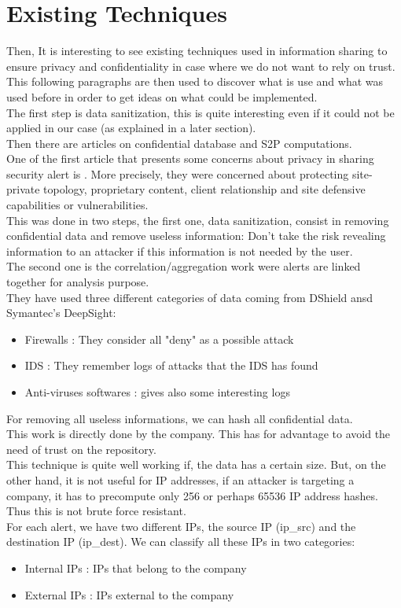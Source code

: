 \documentclass{eplmastersthesis}
\begin{document}
\section{Existing Techniques}
Then, It is interesting to see existing techniques used in information sharing to ensure privacy and confidentiality in case where we do not want to rely on trust. This following paragraphs are then used to discover what is use and what was used before in order to get ideas on what could be implemented.\\

The first step is data sanitization, this is quite interesting even if it could not be applied in our case (as explained in a later section).\\
Then there are articles on confidential database and S2P computations.\\

One of the first article that presents some concerns about privacy in sharing security alert is \cite{lincoln2004privacy}.
More precisely, they were concerned about protecting site-private topology, proprietary content, client relationship and site defensive capabilities or vulnerabilities.\\
This was done in two steps, the first one, data sanitization, consist in removing confidential data and remove useless information: Don't take the risk revealing information to an attacker if this information is not needed by the user.\\
The second one is the correlation/aggregation work were alerts are linked together for analysis purpose.\\
 They have used three different categories of data coming from DShield ansd Symantec's DeepSight:
\begin{itemize}
\item Firewalls : They consider all "deny" as a possible attack
\item IDS : They remember logs of attacks that the IDS has found
\item Anti-viruses softwares : gives also some interesting logs
\end{itemize}

For removing all useless informations, we can hash all confidential data.\\
This work is directly done by the company. This has for advantage to avoid the need of trust on the repository.\\
This technique is quite well working if, the data has a certain size. But, on the other hand, it is not useful for IP addresses, if an attacker is targeting a company, it has to precompute only 256 or perhaps 65536 IP address hashes. Thus this is not brute force resistant.\\
For each alert, we have two different IPs, the source IP (ip\_src) and the destination IP (ip\_dest). We can classify all these IPs in two categories:
\begin{itemize}
	\item Internal IPs : IPs that belong to the company
	\item External IPs : IPs external to the company
\end{itemize}
\end{document}
